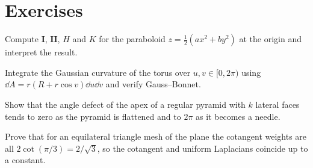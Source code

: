 \section*{Exercises}
\begin{exercise}
Compute $\mathbf I$, $\mathbf{II}$, $H$ and $K$ for the paraboloid $z=\tfrac12(ax^2+by^2)$ at the
origin and interpret the result.
\end{exercise}
\begin{exercise}
Integrate the Gaussian curvature of the torus over $u,v\in[0,2\pi)$ using $\dd A=r(R+r\cos v)\dd u\dd v$
and verify Gauss--Bonnet.
\end{exercise}
\begin{exercise}
Show that the angle defect of the apex of a regular pyramid with $k$ lateral faces tends to zero as
the pyramid is flattened and to $2\pi$ as it becomes a needle.
\end{exercise}
\begin{exercise}
Prove that for an equilateral triangle mesh of the plane the cotangent weights are all
$2\cot(\pi/3)=2/\sqrt3$, so the cotangent and uniform Laplacians coincide up to a constant.
\end{exercise}
